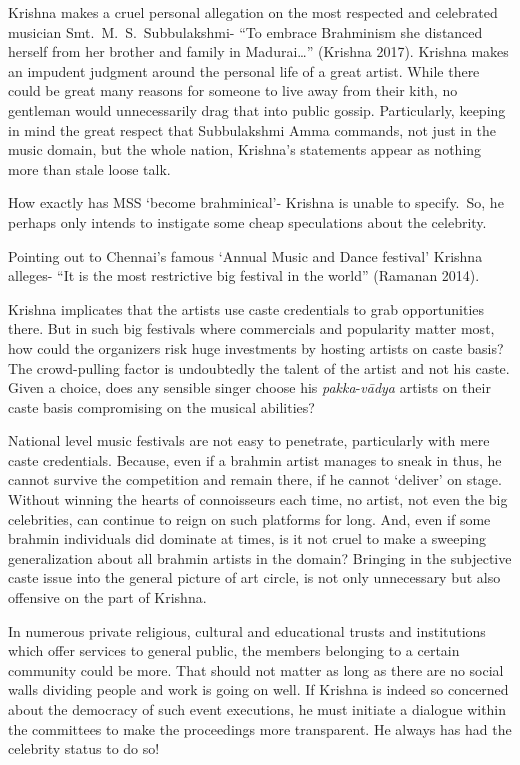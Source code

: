 Krishna makes a cruel personal allegation on the most respected and celebrated musician Smt.~M.~S.~Subbulakshmi- “To embrace Brahminism she distanced herself from her brother and family in Madurai…” (Krishna 2017). Krishna makes an impudent judgment around the personal life of a great artist. While there could be great many reasons for someone to live away from their kith, no gentleman would unnecessarily drag that into public gossip. Particularly, keeping in mind the great respect that Subbulakshmi Amma commands, not just in the music domain, but the whole nation, Krishna’s statements appear as nothing more than stale loose talk.

How exactly has MSS ‘become brahminical’- Krishna is unable to specify.~So, he perhaps only intends to instigate some cheap speculations about the celebrity.

Pointing out to Chennai’s famous ‘Annual Music and Dance festival’ Krishna alleges- “It is the most restrictive big festival in the world” (Ramanan 2014).

Krishna implicates that the artists use caste credentials to grab opportunities there. But in such big festivals where commercials and popularity matter most, how could the organizers risk huge investments by hosting artists on caste basis? The crowd-pulling factor is undoubtedly the talent of the artist and not his caste. Given a choice, does any sensible singer choose his \textit{pakka}-\textit{vādya} artists on their caste basis compromising on the musical abilities?

National level music festivals are not easy to penetrate, particularly with mere caste credentials. Because, even if a brahmin artist manages to sneak in thus, he cannot survive the competition and remain there, if he cannot ‘deliver’ on stage. Without winning the hearts of connoisseurs each time, no artist, not even the big celebrities, can continue to reign on such platforms for long. And, even if some brahmin individuals did dominate at times, is it not cruel to make a sweeping generalization about all brahmin artists in the domain? Bringing in the subjective caste issue into the general picture of art circle, is not only unnecessary but also offensive on the part of Krishna.

In numerous private religious, cultural and educational trusts and institutions which offer services to general public, the members belonging to a certain community could be more. That should not matter as long as there are no social walls dividing people and work is going on well. If Krishna is indeed so concerned about the democracy of such event executions, he must initiate a dialogue within the committees to make the proceedings more transparent. He always has had the celebrity status to do so!

